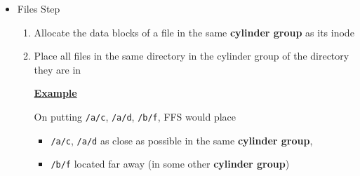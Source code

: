 \documentclass[12pt]{article}
\begin{document}
\begin{itemize}
\begin{itemize}
        \item Files Step

        \begin{enumerate}[1)]
            \item Allocate the data blocks of a file in the same \textbf{cylinder group} as its inode
            \item Place all files in the same directory in the cylinder group of the directory they are in

            \bigskip

            \underline{\textbf{Example}}

            \bigskip

            On putting \texttt{/a/c}, \texttt{/a/d}, \texttt{/b/f}, FFS would place

            \begin{itemize}
                \item \texttt{/a/c}, \texttt{/a/d} as close as possible in the same \textbf{cylinder group},
                \item \texttt{/b/f} located far away (in some other \textbf{cylinder group})
            \end{itemize}
        \end{enumerate}
    \end{itemize}
\end{itemize}
\end{document}
